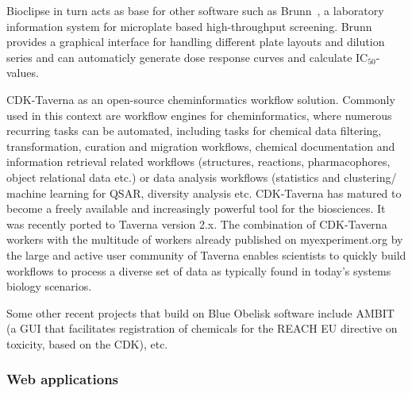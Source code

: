 \documentclass[10pt]{bmc_article}
\newenvironment{bmcformat}{\begin{raggedright}\baselineskip20pt\sloppy\setboolean{publ}{false}}{\end{raggedright}\baselineskip20pt\sloppy}
\begin{document}
\begin{bmcformat}
Bioclipse in turn acts as base for other software
such as Brunn~\cite{WebBrunn}, a laboratory information system for
microplate based high-throughput screening. Brunn provides a graphical interface
for handling different plate layouts and dilution series and can automaticly
generate dose response curves and calculate IC$_{50}$-values.

CDK-Taverna \cite{Kuhn:2010p4001} as an open-source cheminformatics workflow solution.
Commonly used in this context are workflow engines for cheminformatics, where numerous recurring tasks can be automated, including tasks for chemical data filtering, transformation, curation and migration workflows, chemical documentation and information retrieval related workflows (structures, reactions, pharmacophores, object relational data etc.) or data analysis workflows (statistics and clustering/ machine learning for QSAR, diversity analysis etc.
CDK-Taverna has matured to become a freely available and increasingly powerful tool for the biosciences. It was recently ported to
Taverna version 2.x.
The combination of CDK-Taverna workers with the multitude of workers
already published on myexperiment.org by the large and active user
community of Taverna enables scientists to quickly build workflows to
process a diverse set of data as typically found in today's systems
biology scenarios.

Some other recent projects that build on Blue Obelisk software include
AMBIT (a GUI that facilitates registration of chemicals for the REACH
EU directive on toxicity, based on the CDK), etc.

\subsubsection*{Web applications}


\end{bmcformat}
\end{document}
